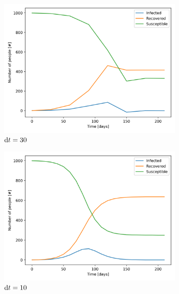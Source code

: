 \documentclass{article}
\begin{document}
\begin{figure}
  \centering
  \begin{subfigure}{0.3\textwidth}
    \includegraphics[width=\linewidth]{./Images/SIR_plot_dt30.png}
    \caption{${\rm d}t=30$}
    \label{subfig:plot1}
  \end{subfigure}
  \begin{subfigure}{0.3\textwidth}
    \includegraphics[width=\linewidth]{./Images/SIR_plot_dt10.png}
    \caption{${\rm d}t=10$}
    \label{subfig:plot2}
  \end{subfigure}
  \begin{subfigure}{0.3\textwidth}

\end{subfigure}
\end{figure}
\end{document}
